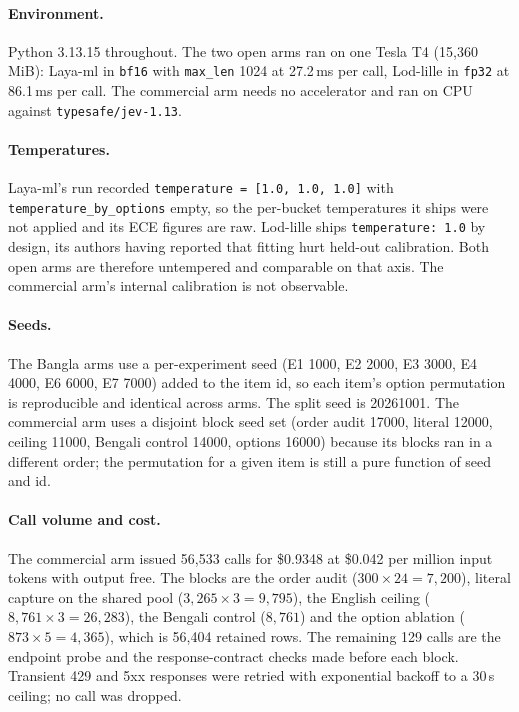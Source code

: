 \documentclass[11pt]{article}
\begin{document}
\paragraph{Environment.} Python 3.13.15 throughout. The two open arms ran on one
Tesla T4 (15{,}360\,MiB): Laya-ml in \texttt{bf16} with \texttt{max\_len} 1024
at 27.2\,ms per call, Lod-lille in \texttt{fp32} at 86.1\,ms per call. The
commercial arm needs no accelerator and ran on CPU against
\texttt{typesafe/jev-1.13}.

\paragraph{Temperatures.} Laya-ml's run recorded
\texttt{temperature = [1.0, 1.0, 1.0]} with \texttt{temperature\_by\_options}
empty, so the per-bucket temperatures it ships were not applied and its ECE
figures are raw. Lod-lille ships \texttt{temperature: 1.0} by design, its
authors having reported that fitting hurt held-out calibration. Both open arms
are therefore untempered and comparable on that axis. The commercial arm's
internal calibration is not observable.

\paragraph{Seeds.} The Bangla arms use a per-experiment seed (E1 1000, E2 2000,
E3 3000, E4 4000, E6 6000, E7 7000) added to the item id, so each item's option
permutation is reproducible and identical across arms. The split seed is
20261001. The commercial arm uses a disjoint block seed set (order audit 17000,
literal 12000, ceiling 11000, Bengali control 14000, options 16000) because its
blocks ran in a different order; the permutation for a given item is still a
pure function of seed and id.

\paragraph{Call volume and cost.} The commercial arm issued 56{,}533 calls for
\$0.9348 at \$0.042 per million input tokens with output free. The blocks are
the order audit ($300 \times 24 = 7{,}200$), literal capture on the shared pool
($3{,}265 \times 3 = 9{,}795$), the English ceiling ($8{,}761 \times 3 =
26{,}283$), the Bengali control ($8{,}761$) and the option ablation ($873
\times 5 = 4{,}365$), which is 56{,}404 retained rows. The remaining 129 calls
are the endpoint probe and the response-contract checks made before each block.
Transient 429 and 5xx responses were retried with exponential backoff to a
30\,s ceiling; no call was dropped.
\end{document}
